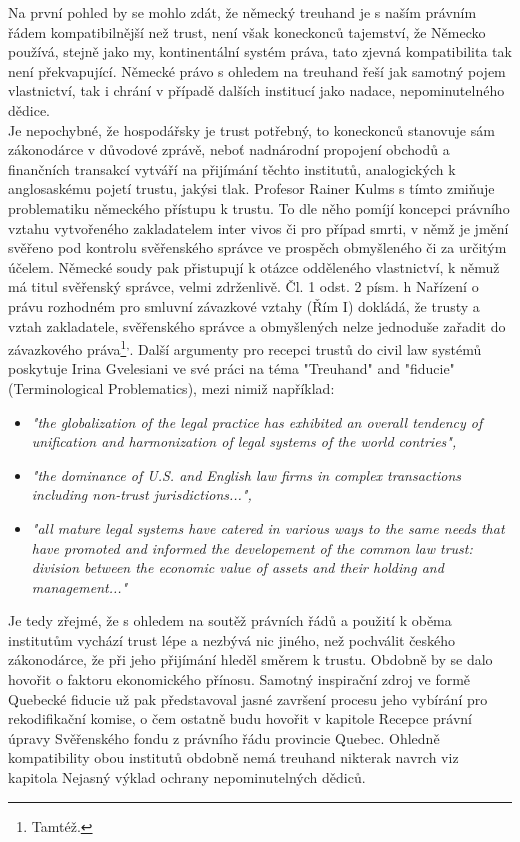 \documentclass{article}
\begin{document}
 Na první pohled by se mohlo zdát, že německý treuhand je s naším právním řádem kompatibilnější než trust, není však koneckonců tajemství, že Německo používá, stejně jako my, kontinentální systém práva, tato zjevná kompatibilita tak není překvapující. Německé právo s ohledem na treuhand řeší jak samotný pojem vlastnictví, tak i chrání v případě dalších institucí jako nadace, nepominutelného dědice.\\
 
 Je nepochybné, že hospodářsky je trust potřebný, to koneckonců stanovuje sám zákonodárce v důvodové zprávě, neboť nadnárodní propojení obchodů a finančních transakcí vytváří na přijímání těchto institutů, analogických k anglosaskému pojetí trustu, jakýsi tlak. Profesor Rainer Kulms s tímto zmiňuje problematiku německého přístupu k trustu. To dle něho pomíjí koncepci právního vztahu vytvořeného zakladatelem inter vivos či pro případ smrti, v němž je jmění svěřeno pod kontrolu svěřenského správce ve prospěch obmyšleného či za určitým účelem. Německé soudy pak přistupují k otázce odděleného vlastnictví, k němuž má titul svěřenský správce, velmi zdrženlivě. Čl. 1 odst. 2 písm. h Nařízení o právu rozhodném pro smluvní závazkové vztahy (Řím I) dokládá, že trusty a vztah zakladatele, svěřenského správce a obmyšlených nelze jednoduše zařadit do závazkového práva\footnote{Tamtéž.}\textsuperscript{,}. Další argumenty pro recepci trustů do civil law systémů poskytuje Irina Gvelesiani ve své práci na téma "Treuhand" and "fiducie" (Terminological Problematics), mezi nimiž například:\\
 
 \begin{itemize}
 \item \textit{"the globalization of the legal practice has exhibited an overall tendency of unification and harmonization of legal systems of the world contries",}	
 \item \textit{"the dominance of U.S. and English law firms in complex transactions including non-trust jurisdictions...",}
 \item \textit{"all mature legal systems have catered in various ways to the same needs that have promoted and informed the developement of the common law trust: division between the economic value of assets and their holding and management..."}
 \end{itemize}

Je tedy zřejmé, že s ohledem na soutěž právních řádů a použití k oběma institutům vychází trust lépe a nezbývá nic jiného, než pochválit českého zákonodárce, že při jeho přijímání hleděl směrem k trustu. Obdobně by se dalo hovořit o faktoru ekonomického přínosu. Samotný inspirační zdroj ve formě Quebecké fiducie už pak představoval jasné završení procesu jeho vybírání pro rekodifikační komise, o čem ostatně budu hovořit v kapitole Recepce právní úpravy Svěřenského fondu z právního řádu provincie Quebec. Ohledně kompatibility obou institutů obdobně nemá treuhand nikterak navrch viz kapitola Nejasný výklad ochrany nepominutelných dědiců.\\
\end{document}
